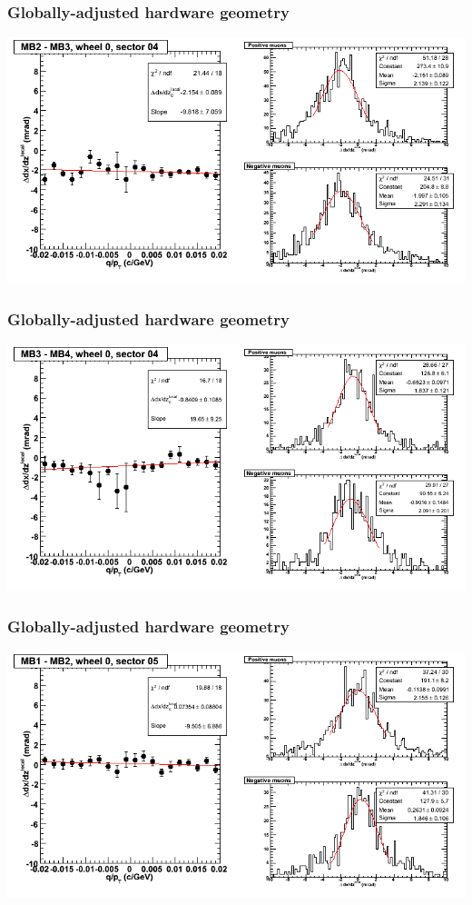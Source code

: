\documentclass[compress]{beamer}
\begin{document}
\begin{frame}
\frametitle{Globally-adjusted hardware geometry}
\includegraphics[width=\linewidth]{NOV4_segdiffs_HW/dt13_slope_C_04_23.png}
\end{frame}

\begin{frame}
\frametitle{Globally-adjusted hardware geometry}
\includegraphics[width=\linewidth]{NOV4_segdiffs_HW/dt13_slope_C_04_34.png}
\end{frame}

\begin{frame}
\frametitle{Globally-adjusted hardware geometry}
\includegraphics[width=\linewidth]{NOV4_segdiffs_HW/dt13_slope_C_05_12.png}
\end{frame}
\end{document}
